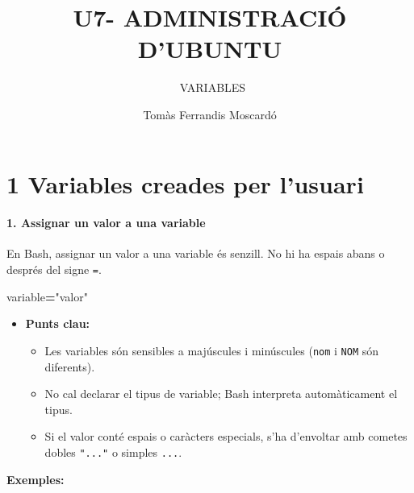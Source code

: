 \documentclass[
  12 pt,
  a4paper,
]{article}
\title{U7- ADMINISTRACIÓ D'UBUNTU}
\subtitle{~VARIABLES}
\author{Tomàs Ferrandis Moscardó}
\date{}
\newenvironment{Shaded}{\begin{snugshade}}{\end{snugshade}}
\newcommand{\BuiltInTok}[1]{#1}
\newcommand{\OperatorTok}[1]{\textcolor[rgb]{0.81,0.36,0.00}{\textbf{#1}}}
\newcommand{\StringTok}[1]{\textcolor[rgb]{0.31,0.60,0.02}{#1}}
\newcommand{\VariableTok}[1]{\textcolor[rgb]{0.00,0.00,0.00}{#1}}
\providecommand{\tightlist}{%
  \setlength{\itemsep}{0pt}\setlength{\parskip}{0pt}}
\begin{document}
\maketitle

\section{1 Variables creades per
l'usuari}\label{variables-creades-per-lusuari}

\paragraph{\texorpdfstring{\textbf{1. Assignar un valor a una
variable}}{1. Assignar un valor a una variable}}\label{assignar-un-valor-a-una-variable}

En Bash, assignar un valor a una variable és senzill. No hi ha espais
abans o després del signe \texttt{=}.

\begin{Shaded}
\begin{Highlighting}[]
\VariableTok{variable}\OperatorTok{=}\StringTok{"valor"}
\end{Highlighting}
\end{Shaded}

\begin{itemize}
\tightlist
\item
  \textbf{Punts clau:}

  \begin{itemize}
  \tightlist
  \item
    Les variables són sensibles a majúscules i minúscules (\texttt{nom}
    i \texttt{NOM} són diferents).
  \item
    No cal declarar el tipus de variable; Bash interpreta automàticament
    el tipus.
  \item
    Si el valor conté espais o caràcters especials, s'ha d'envoltar amb
    cometes dobles \texttt{"..."} o simples
    \texttt{\textquotesingle{}...\textquotesingle{}}.
  \end{itemize}
\end{itemize}

\textbf{Exemples:}

\begin{Shaded}
\end{Shaded}
\end{document}
